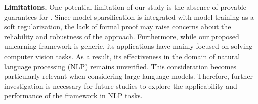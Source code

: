\noindent \textbf{Limitations.} %
One potential limitation of our study is the absence of provable guarantees for {\MUSparse}. Since model sparsification is integrated with model training as a soft regularization, the lack of formal proof may raise concerns about the reliability and robustness of the approach.
Furthermore, while our proposed unlearning framework is generic, its applications have mainly focused on solving computer vision tasks. As a result, its effectiveness in the domain of natural language processing (NLP) remains unverified. This consideration becomes particularly relevant when considering large language models. Therefore, further investigation is necessary for future studies to explore the applicability and performance of the framework in NLP tasks.





  
